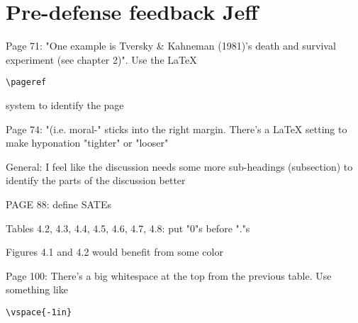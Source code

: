 \documentclass[12pt]{article}
\begin{document}
\section*{Pre-defense feedback Jeff}
	\begin{coi}
		\item Page 71: "One example is Tversky \& Kahneman (1981)'s death and survival experiment (see chapter 2)". Use the LaTeX \begin{verbatim}\pageref\end{verbatim} system to identify the page
		\item Page 74: "(i.e. moral-" sticks into the right margin. There's a LaTeX setting to make hyponation "tighter" or "looser"
		\item General: I feel like the discussion needs some more sub-headings (subsection) to identify the parts of the discussion better
		\item PAGE 88: define SATEs
		\item Tables 4.2, 4.3, 4.4, 4.5, 4.6, 4.7, 4.8: put "0"s before "."s
		\item Figures 4.1 and 4.2 would benefit from some color
		\item Page 100: There's a big whitespace at the top from the previous table. Use something like \begin{verbatim}\vspace{-1in}\end{verbatim}
	\end{coi}
\end{document}
